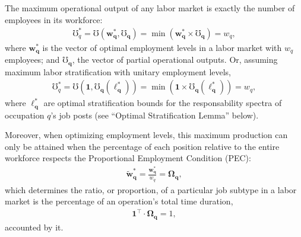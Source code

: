\documentclass[hidelinks, nonatbib]{elsarticle}
\begin{document}
\begin{lemma}
    The maximum operational output of any labor market is exactly the number of employees in its workforce:
    \begin{gather}
        \mho_{q}^{*}
        =
        \mho(
            \boldsymbol{w_{q}^{*}},
            \boldsymbol{\mho_q}
        ) = 
        \min(
            \boldsymbol{w_{q}^{*}}
            \times
            \boldsymbol{\mho_q}
        )
        = w_q
        ,
    \end{gather}
    where $\boldsymbol{w_{q}^{*}}$ is the vector of optimal employment levels in a labor market with $w_q$ employees; and $\boldsymbol{\mho_q}$, the vector of partial operational outputs. Or, assuming maximum labor stratification with unitary employment levels,
    \begin{gather}
        \mho_{q}^{*}
        =
        \mho(
            \boldsymbol{1},
            \boldsymbol{\mho_q}(
                \boldsymbol{\ell_{q}^{*}}
            )
        )
        =
        \min(
            \boldsymbol{1}
            \times
            \boldsymbol{\mho_q}(
                \boldsymbol{\ell_{q}^{*}}
            )
        )
        = w_q
        ,
    \end{gather}
    where $\boldsymbol{\ell_{q}^{*}}$ are optimal stratification bounds for the responsability spectra of occupation $q$'s job posts (see ``Optimal Stratification Lemma'' below).
    
    Moreover, when optimizing employment levels, this maximum production can only be attained when the percentage of each position relative to the entire workforce respects the Proportional Employment Condition (PEC):
    \begin{gather}
        \boldsymbol{\tilde{w}_{q}^{*}}
        =
        \frac{
            \boldsymbol{w_{q}^{*}}
        }{
            w_q
        }
        =
        \boldsymbol{\Omega_{q}}
        ,
    \end{gather}
    which determines the ratio, or proportion, of a particular job subtype in a labor market is the percentage of an operation's total time duration,
    \begin{gather}
        \boldsymbol{1} ^ {\top}
        \cdot
        \boldsymbol{\Omega_{q}}
        = 1
        ,
    \end{gather}
    accounted by it.
    

\end{lemma}
\end{document}
